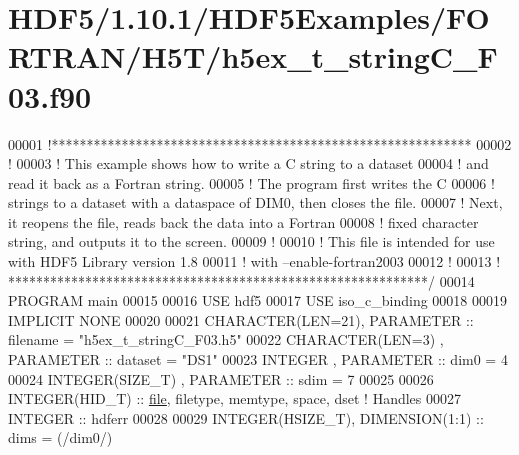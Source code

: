\hypertarget{_h_d_f5_21_810_81_2_h_d_f5_examples_2_f_o_r_t_r_a_n_2_h5_t_2h5ex__t__string_c___f03_8f90_source}{}\section{H\+D\+F5/1.10.1/\+H\+D\+F5\+Examples/\+F\+O\+R\+T\+R\+A\+N/\+H5\+T/h5ex\+\_\+t\+\_\+string\+C\+\_\+\+F03.f90}
\label{_h_d_f5_21_810_81_2_h_d_f5_examples_2_f_o_r_t_r_a_n_2_h5_t_2h5ex__t__string_c___f03_8f90_source}

\begin{DoxyCode}
00001 \textcolor{comment}{!************************************************************}
00002 \textcolor{comment}{!}
00003 \textcolor{comment}{!  This example shows how to write a C string to a dataset }
00004 \textcolor{comment}{!  and read it back as a Fortran string.}
00005 \textcolor{comment}{!  The program first writes the C }
00006 \textcolor{comment}{!  strings to a dataset with a dataspace of DIM0, then closes the file.}
00007 \textcolor{comment}{!  Next, it reopens the file, reads back the data into a Fortran}
00008 \textcolor{comment}{!  fixed character string, and outputs it to the screen.}
00009 \textcolor{comment}{!}
00010 \textcolor{comment}{!  This file is intended for use with HDF5 Library version 1.8}
00011 \textcolor{comment}{!  with --enable-fortran2003 }
00012 \textcolor{comment}{!}
00013 \textcolor{comment}{! ************************************************************/}
00014 \textcolor{keyword}{PROGRAM} main
00015 
00016   \textcolor{keywordtype}{USE }hdf5
00017   \textcolor{keywordtype}{USE }iso\_c\_binding
00018 
00019   \textcolor{keywordtype}{IMPLICIT NONE}
00020 
00021   \textcolor{keywordtype}{CHARACTER(LEN=21)}, \textcolor{keywordtype}{PARAMETER} :: filename  = \textcolor{stringliteral}{"h5ex\_t\_stringC\_F03.h5"}
00022   \textcolor{keywordtype}{CHARACTER(LEN=3)} , \textcolor{keywordtype}{PARAMETER} :: dataset   = \textcolor{stringliteral}{"DS1"}
00023   \textcolor{keywordtype}{INTEGER}          , \textcolor{keywordtype}{PARAMETER} :: dim0      = 4
00024   \textcolor{keywordtype}{INTEGER(SIZE\_T)}  , \textcolor{keywordtype}{PARAMETER} :: sdim      = 7
00025 
00026   \textcolor{keywordtype}{INTEGER(HID\_T)}  :: \hyperlink{structfile}{file}, filetype, memtype, space, dset \textcolor{comment}{! Handles}
00027   \textcolor{keywordtype}{INTEGER} :: hdferr
00028 
00029   \textcolor{keywordtype}{INTEGER(HSIZE\_T)}, \textcolor{keywordtype}{DIMENSION(1:1)} :: dims = (/dim0/)

\end{DoxyCode}
